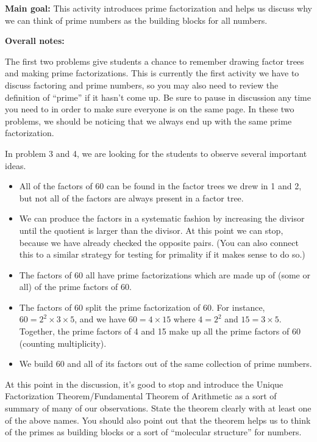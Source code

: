 \documentclass[noauthor, nooutcomes, handout]{ximera}
\begin{document}
\newpage
\begin{instructorNotes}

{\bf Main goal:} This activity introduces prime factorization and helps us discuss why we can think of prime numbers as the building blocks for all numbers.

{\bf Overall notes:} 

The first two problems give students a chance to remember drawing factor trees and making prime factorizations. This is currently the first activity we have to discuss factoring and prime numbers, so you may also need to review the definition of ``prime'' if it hasn't come up. Be sure to pause in discussion any time you need to in order to make sure everyone is on the same page. In these two problems, we should be noticing that we always end up with the same prime factorization.

In problem 3 and 4, we are looking for the students to observe several important ideas.
\begin{itemize}
	\item All of the factors of 60 can be found in the factor trees we drew in 1 and 2, but not all of the factors are always present in a factor tree.
	\item We can produce the factors in a systematic fashion by increasing the divisor until the quotient is larger than the divisor. At this point we can stop, because we have already checked the opposite pairs. (You can also connect this to a similar strategy for testing for primality if it makes sense to do so.)
	\item The factors of 60 all have prime factorizations which are made up of (some or all) of the prime factors of 60.
	\item The factors of 60 split the prime factorization of 60. For instance, $60 = 2^2 \times 3 \times 5$, and we have $60 = 4 \times 15$ where $4 = 2^2$ and $15 = 3 \times 5$. Together, the prime factors of 4 and 15 make up all the prime factors of 60 (counting multiplicity). 
	\item We build 60 and all of its factors out of the same collection of prime numbers.
\end{itemize}
At this point in the discussion, it's good to stop and introduce the Unique Factorization Theorem/Fundamental Theorem of Arithmetic as a sort of summary of many of our observations. State the theorem clearly with at least one of the above names. You should also point out that the theorem helps us to think of the primes as building blocks or a sort of ``molecular structure'' for numbers.


\end{instructorNotes}
\end{document}
